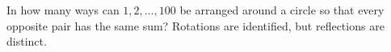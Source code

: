 In how many ways can $1,2,\ldots,100$ be arranged around a circle so that every opposite pair has the same sum? Rotations are identified, but reflections are distinct.
